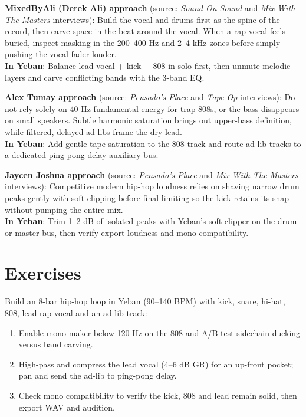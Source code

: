 \begin{tipbox}
\textbf{MixedByAli (Derek Ali) approach} (source: \emph{Sound On Sound} and \emph{Mix With The Masters} interviews): Build the vocal and drums first as the spine of the record, then carve space in the beat around the vocal. When a rap vocal feels buried, inspect masking in the 200--400 Hz and 2--4 kHz zones before simply pushing the vocal fader louder.\\
\textbf{In Yeban}: Balance lead vocal + kick + 808 in solo first, then unmute melodic layers and carve conflicting bands with the 3-band EQ.
\end{tipbox}

\begin{tipbox}
\textbf{Alex Tumay approach} (source: \emph{Pensado's Place} and \emph{Tape Op} interviews): Do not rely solely on 40 Hz fundamental energy for trap 808s, or the bass disappears on small speakers. Subtle harmonic saturation brings out upper-bass definition, while filtered, delayed ad-libs frame the dry lead.\\
\textbf{In Yeban}: Add gentle tape saturation to the 808 track and route ad-lib tracks to a dedicated ping-pong delay auxiliary bus.
\end{tipbox}

\begin{tipbox}
\textbf{Jaycen Joshua approach} (source: \emph{Pensado's Place} and \emph{Mix With The Masters} interviews): Competitive modern hip-hop loudness relies on shaving narrow drum peaks gently with soft clipping before final limiting so the kick retains its snap without pumping the entire mix.\\
\textbf{In Yeban}: Trim 1--2 dB of isolated peaks with Yeban's soft clipper on the drum or master bus, then verify export loudness and mono compatibility.
\end{tipbox}

\section{Exercises}

\begin{exercise}
Build an 8-bar hip-hop loop in Yeban (90--140 BPM) with kick, snare, hi-hat, 808, lead rap vocal and an ad-lib track:
\begin{enumerate}
  \item Enable mono-maker below 120 Hz on the 808 and A/B test sidechain ducking versus band carving.
  \item High-pass and compress the lead vocal (4--6 dB GR) for an up-front pocket; pan and send the ad-lib to ping-pong delay.
  \item Check mono compatibility to verify the kick, 808 and lead remain solid, then export WAV and audition.
\end{enumerate}
\end{exercise}

